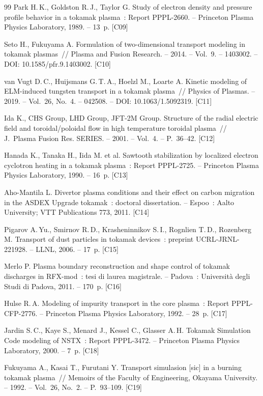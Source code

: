 \documentclass[11pt,a4paper]{article}
\begin{document}
\begin{thebibliography}{99}
 Park H.\,K., Goldston R.\,J., Taylor G. Study of electron density
  and pressure profile behavior in a tokamak plasma~: Report PPPL-2660. -- Princeton
  Plasma Physics Laboratory, 1989. -- 13~p. [C09]

 Seto H., Fukuyama A. Formulation of two-dimensional transport
  modeling in tokamak plasmas~// Plasma and Fusion Research. -- 2014. -- Vol.~9. --
  1403002. -- DOI: 10.1585/pfr.9.1403002. [C10]

 van Vugt D.\,C., Huijsmans G.\,T.\,A., Hoelzl M., Loarte A.
  Kinetic modeling of ELM-induced tungsten transport in a tokamak plasma~// Physics of
  Plasmas. -- 2019. -- Vol.~26, No.~4. -- 042508. -- DOI: 10.1063/1.5092319. [C11]

 Ida K., CHS Group, LHD Group, JFT-2M Group. Structure of the radial
  electric field and toroidal/poloidal flow in high temperature toroidal plasma~//
  J.~Plasma Fusion Res. SERIES. -- 2001. -- Vol.~4. -- P.~36--42. [C12]

 Hanada K., Tanaka H., Iida M. et al. Sawtooth stabilization by
  localized electron cyclotron heating in a tokamak plasma~: Report PPPL-2725. --
  Princeton Plasma Physics Laboratory, 1990. -- 16~p. [C13]

 Aho-Mantila L. Divertor plasma conditions and their effect on
  carbon migration in the ASDEX Upgrade tokamak~: doctoral dissertation. -- Espoo~:
  Aalto University; VTT Publications 773, 2011. [C14]

 Pigarov A.\,Yu., Smirnov R.\,D., Krasheninnikov S.\,I.,
  Rognlien T.\,D., Rozenberg M. Transport of dust particles in tokamak devices~:
  preprint UCRL-JRNL-221928. -- LLNL, 2006. -- 17~p. [C15]

 Merlo P. Plasma boundary reconstruction and shape control of
  tokamak discharges in RFX-mod~: tesi di laurea magistrale. -- Padova~: Università
  degli Studi di Padova, 2011. -- 170~p. [C16]

 Hulse R.\,A. Modeling of impurity transport in the core plasma~:
  Report PPPL-CFP-2776. -- Princeton Plasma Physics Laboratory, 1992. -- 28~p. [C17]

 Jardin S.\,C., Kaye S., Menard J., Kessel C., Glasser A.\,H.
  Tokamak Simulation Code modeling of NSTX~: Report PPPL-3472. -- Princeton Plasma
  Physics Laboratory, 2000. -- 7~p. [C18]

 Fukuyama A., Kasai T., Furutani Y. Transport simulasion [sic]
  in a burning tokamak plasma~// Memoirs of the Faculty of Engineering, Okayama
  University. -- 1992. -- Vol.~26, No.~2. -- P.~93--109. [C19]


\end{thebibliography}
\end{document}
